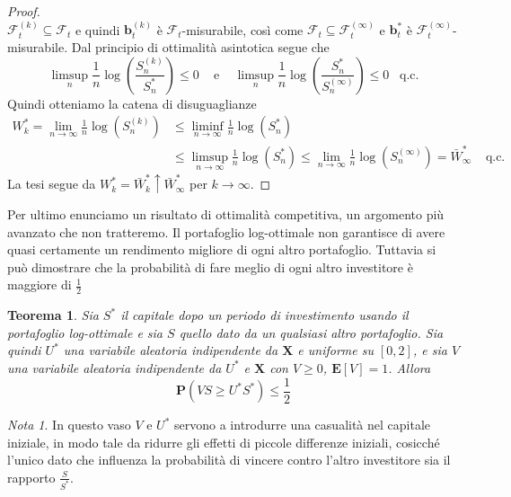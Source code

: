 \documentclass[a4paper,11pt]{book}
\theoremstyle{plain}
\newtheorem{teo}{Teorema}[chapter]
\theoremstyle{definition}
\theoremstyle{remark}
\newtheorem*{nota}{Nota}
\newcommand{\X}{\bm{X}}
\newcommand{\B}{\bm{b}}
\newcommand{\F}{\mathcal{F}}
\newcommand{\Pro}{\mathbf{P}}
\newcommand{\E}{\mathbf{E}}
\begin{document}
\begin{proof}
\begin{equation*}
	\end{equation*}
	$\F_t^{(k)}\subseteq \F_t$ e quindi $\B_t^{(k)}$ è $\F_t$-misurabile, così come $\F_t\subseteq \F_t^{(\infty)}$ e $\B_t^*$ è $\F_t^{(\infty)}$-misurabile.\newline
	Dal principio di ottimalità asintotica segue che
	\begin{equation*}
		\limsup \limits_{n}\frac{1}{n}\log\left(\frac{S_n^{(k)}}{S_n^*}\right)\leq 0 \;\;\; \text{ e } \;\;\; \limsup\limits_{n}\frac{1}{n}\log\left(\frac{S_n^*}{S_n^{(\infty)}}\right)\leq 0 \;\;\; \text{q.c.}
	\end{equation*}
	Quindi otteniamo la catena di disuguaglianze
	\begin{equation*}
	\begin{split}
		W_k^*=\lim\limits_{n\to\infty}\frac{1}{n}\log(S_n^{(k)}) & \leq \liminf\limits_{n\to\infty}\frac{1}{n}\log(S_n^*)\\
		& \leq \limsup\limits_{n\to\infty}\frac{1}{n}\log(S_n^*)\leq \lim\limits_{n\to \infty}\frac{1}{n}\log(S_n^{(\infty)})=\bar{W}^*_\infty\;\;\;\; \text{q.c.}
	\end{split}
	\end{equation*}
	La tesi segue da $W^*_k = \bar{W}_k^*\uparrow \bar{W}_\infty^*$ per $k \to \infty$.
\end{proof}
Per ultimo enunciamo un risultato di ottimalità competitiva, un argomento più avanzato che non tratteremo. Il portafoglio log-ottimale non garantisce di avere quasi certamente un rendimento migliore di ogni altro portafoglio. Tuttavia si può dimostrare che la probabilità di fare meglio di ogni altro investitore è maggiore di $\frac{1}{2}$
\begin{teo}
	Sia $S^*$ il capitale dopo un periodo di investimento usando il portafoglio log-ottimale e sia $S$ quello dato da un qualsiasi altro portafoglio. Sia quindi $U^*$ una variabile aleatoria indipendente da $\X$ e uniforme su $[0,2]$, e sia $V$ una variabile aleatoria indipendente da $U^*$ e $\X$ con $V\geq 0$, $\E[V] = 1$. Allora
	\begin{equation*}
		\Pro(VS\geq U^*S^*)\leq \frac{1}{2}
	\end{equation*}
\end{teo}
\begin{nota}
	In questo vaso $V$ e $U^*$ servono a introdurre una casualità nel capitale iniziale, in modo tale da ridurre gli effetti di piccole differenze iniziali, cosicché l'unico dato che influenza la probabilità di vincere contro l'altro investitore sia il rapporto $\frac{S}{S^*}$.
\end{nota}
\end{document}
